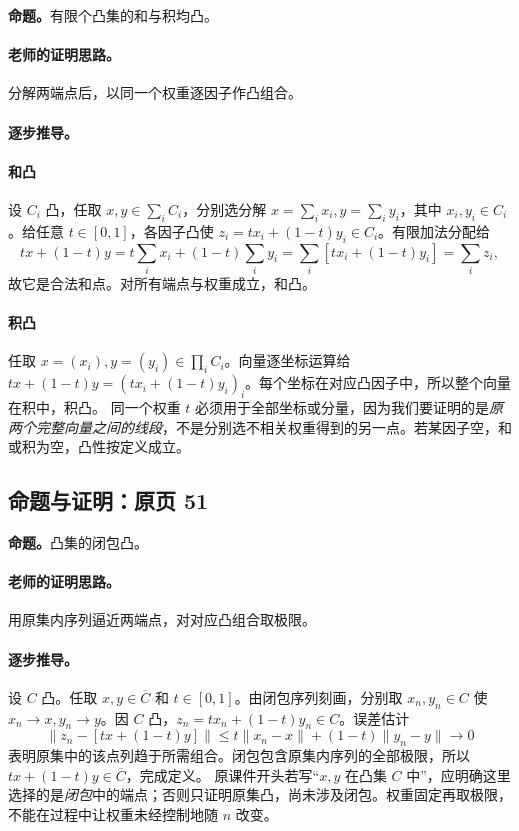 \documentclass[11pt,a4paper]{article}
\theoremstyle{definition}\newtheorem{definition}{定义}\newtheorem{example}{例}
\begin{document}
\textbf{命题。}有限个凸集的和与积均凸。

\paragraph{老师的证明思路。}分解两端点后，以同一个权重逐因子作凸组合。

\paragraph{逐步推导。}
\paragraph{和凸}设 $C_i$ 凸，任取 $x,y\in\sum_iC_i$，分别选分解 $x=\sum_ix_i,y=\sum_iy_i$，其中 $x_i,y_i\in C_i$。给任意 $t\in[0,1]$，各因子凸使 $z_i=tx_i+(1-t)y_i\in C_i$。有限加法分配给
\[tx+(1-t)y=t\sum_ix_i+(1-t)\sum_iy_i=\sum_i[tx_i+(1-t)y_i]=\sum_iz_i,\]
故它是合法和点。对所有端点与权重成立，和凸。
\paragraph{积凸}任取 $x=(x_i),y=(y_i)\in\prod_iC_i$。向量逐坐标运算给 $tx+(1-t)y=(tx_i+(1-t)y_i)_i$。每个坐标在对应凸因子中，所以整个向量在积中，积凸。
同一个权重 $t$ 必须用于全部坐标或分量，因为我们要证明的是\emph{原两个完整向量之间的线段}，不是分别选不相关权重得到的另一点。若某因子空，和或积为空，凸性按定义成立。


\subsection{命题与证明：原页 51}

\textbf{命题。}凸集的闭包凸。

\paragraph{老师的证明思路。}用原集内序列逼近两端点，对对应凸组合取极限。

\paragraph{逐步推导。}
设 $C$ 凸。任取 $x,y\in\overline C$ 和 $t\in[0,1]$。由闭包序列刻画，分别取 $x_n,y_n\in C$ 使 $x_n\to x,y_n\to y$。因 $C$ 凸，$z_n=tx_n+(1-t)y_n\in C$。误差估计
\[\|z_n-[tx+(1-t)y]\|\le t\|x_n-x\|+(1-t)\|y_n-y\|\to0\]
表明原集中的该点列趋于所需组合。闭包包含原集内序列的全部极限，所以 $tx+(1-t)y\in\overline C$，完成定义。
原课件开头若写“$x,y$ 在凸集 $C$ 中”，应明确这里选择的是\emph{闭包}中的端点；否则只证明原集凸，尚未涉及闭包。权重固定再取极限，不能在过程中让权重未经控制地随 $n$ 改变。
\end{document}
